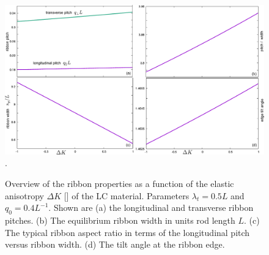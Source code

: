 \begin{figure}
\begin{center}
\includegraphics[width=   \columnwidth]{figures/chapter-5/deltak}.
\caption{ \label{fig3} Overview of the ribbon properties as a function of the elastic anisotropy $\Delta K$ [] of the LC material. Parameters $\lambda_{t} = 0.5 L$ and $q_{0} = 0.4 L^{-1}$. Shown are (a) the longitudinal and transverse ribbon pitches. (b) The equilibrium ribbon width in units rod length $L$. (c) The typical ribbon aspect ratio in terms of the longitudinal pitch versus ribbon width. (d) The tilt angle at the ribbon edge.   }
\end{center}
\end{figure}


